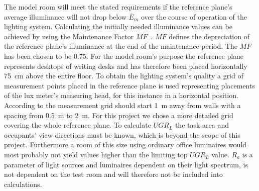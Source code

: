 The model room will meet the stated requirements if the reference plane's average illuminance will not drop below $\overline{E}_{m}$ over the course of operation of the lighting system. Calculating the initially needed illuminance values can be achieved by using the Maintenance Factor $MF$~\cite{CIE97}. $MF$ defines the depreciation of the reference plane's illuminance at the end of the maintenance period. The $MF$ has been chosen to be 0.75. For the model room's purpose the reference plane~\cite{12464} represents desktops of writing desks and has therefore been placed horizontally 75~cm above the entire floor. To obtain the lighting system's quality a grid of measurement points placed in the reference plane is used representing placements of the lux meter's measuring head, for this instance in a horizontal position. According to \cite{360011} the measurement grid should start 1~m away from walls with a spacing from 0.5~m to 2~m. For this project we chose a more detailed grid covering the whole reference plane. To calculate $UGR_{L}$ the task area and occupants' view directions must be known, which is beyond the scope of this project. Furthermore a room of this size using ordinary office luminaires would most probably not yield values higher than the limiting top $UGR_{L}$ value. $R_{a}$ is a parameter of light sources and luminaires dependent on their light spectrum, is not dependent on the test room and will therefore not be included into calculations.